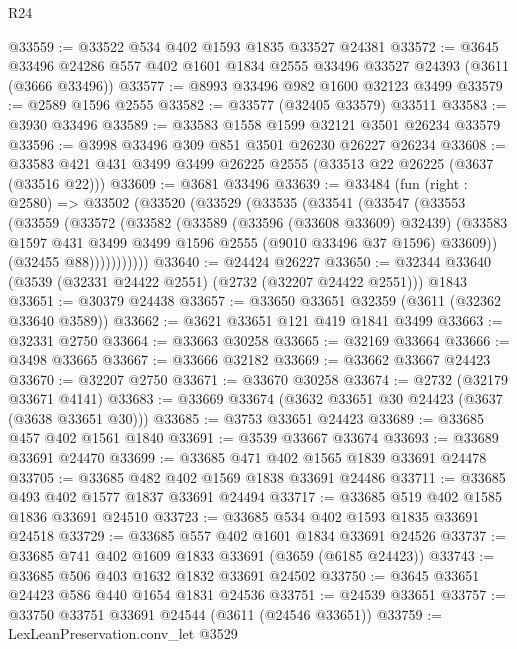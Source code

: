 \begin{lexlean}{R24}
\begin{coremodule}
@33559 := @33522 @534 @402 @1593 @1835 @33527 @24381
@33572 := @3645
    @33496
    @24286
    @557
    @402
    @1601
    @1834
    @2555
    @33496
    @33527
    @24393
    (@3611 (@3666 @33496))
@33577 := @8993 @33496 @982 @1600 @32123 @3499
@33579 := @2589 @1596 @2555
@33582 := @33577 (@32405 @33579) @33511
@33583 := @3930 @33496
@33589 := @33583 @1558 @1599 @32121 @3501 @26234 @33579
@33596 := @3998 @33496 @309 @851 @3501 @26230 @26227 @26234
@33608 := @33583 @421 @431 @3499 @3499 @26225 @2555 (@33513 @22 @26225 (@3637 (@33516 @22)))
@33609 := @3681 @33496
@33639 := @33484
    (fun (right : @2580) =>
    @33502
      (@33520
        (@33529
          (@33535
            (@33541
              (@33547
                (@33553
                  (@33559
                    (@33572
                      (@33582
                        (@33589
                          (@33596 (@33608 @33609) @32439)
                          (@33583
                            @1597
                            @431
                            @3499
                            @3499
                            @1596
                            @2555
                            (@9010 @33496 @37 @1596)
                            @33609))
                        (@32455 @88)))))))))))
@33640 := @24424 @26227
@33650 := @32344 @33640 (@3539 (@32331 @24422 @2551) (@2732 (@32207 @24422 @2551))) @1843
@33651 := @30379 @24438
@33657 := @33650 @33651 @32359 (@3611 (@32362 @33640 @3589))
@33662 := @3621 @33651 @121 @419 @1841 @3499
@33663 := @32331 @2750
@33664 := @33663 @30258
@33665 := @32169 @33664
@33666 := @3498 @33665
@33667 := @33666 @32182
@33669 := @33662 @33667 @24423
@33670 := @32207 @2750
@33671 := @33670 @30258
@33674 := @2732 (@32179 @33671 @4141)
@33683 := @33669 @33674 (@3632 @33651 @30 @24423 (@3637 (@3638 @33651 @30)))
@33685 := @3753 @33651 @24423
@33689 := @33685 @457 @402 @1561 @1840
@33691 := @3539 @33667 @33674
@33693 := @33689 @33691 @24470
@33699 := @33685 @471 @402 @1565 @1839 @33691 @24478
@33705 := @33685 @482 @402 @1569 @1838 @33691 @24486
@33711 := @33685 @493 @402 @1577 @1837 @33691 @24494
@33717 := @33685 @519 @402 @1585 @1836 @33691 @24510
@33723 := @33685 @534 @402 @1593 @1835 @33691 @24518
@33729 := @33685 @557 @402 @1601 @1834 @33691 @24526
@33737 := @33685 @741 @402 @1609 @1833 @33691 (@3659 (@6185 @24423))
@33743 := @33685 @506 @403 @1632 @1832 @33691 @24502
@33750 := @3645 @33651 @24423 @586 @440 @1654 @1831 @24536
@33751 := @24539 @33651
@33757 := @33750 @33751 @33691 @24544 (@3611 (@24546 @33651))
@33759 := LexLeanPreservation.conv_let @3529

\end{coremodule}
\end{lexlean}
